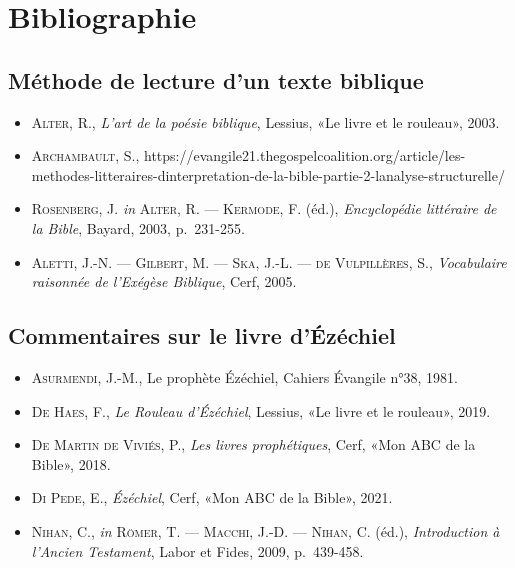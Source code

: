 \section*{Bibliographie}
\subsection*{Méthode de lecture d'un texte biblique}
\begin{itemize}[label=]
    \item \textsc{Alter, R.}, \textit{L'art de la poésie biblique}, Lessius, «Le livre et le rouleau», 2003.
    \item \textsc{Archambault, S.}, https://evangile21.thegospelcoalition.org/article/les-methodes-litteraires-dinterpretation-de-la-bible-partie-2-lanalyse-structurelle/
    \item \textsc{Rosenberg, J.} \textit{in} \textsc{Alter, R. — Kermode, F.} (éd.), \textit{Encyclopédie littéraire de la Bible}, Bayard, 2003, p.~231-255.
    \item \textsc{Aletti, J.-N. — Gilbert, M. — Ska, J.-L. — de Vulpillères, S.}, \textit{Vocabulaire raisonnée de l'Exégèse Biblique}, Cerf, 2005.
\end{itemize}
\subsection*{Commentaires sur le livre d'Ézéchiel}
\begin{itemize}[label=]
    \item \textsc{Asurmendi, J.-M.}, Le prophète Ézéchiel, Cahiers Évangile n°38, 1981.
    \item \textsc{De Haes, F.}, \textit{Le Rouleau d'Ézéchiel}, Lessius, «Le livre et le rouleau», 2019.
    \item \textsc{De Martin de Viviés, P.}, \textit{Les livres prophétiques}, Cerf, «Mon ABC de la Bible», 2018.
    \item \textsc{Di Pede, E.}, \textit{Ézéchiel}, Cerf, «Mon ABC de la Bible», 2021.
    \item \textsc{Nihan, C.}, \textit{in} \textsc{Römer, T. — Macchi, J.-D. — Nihan, C.} (éd.), \textit{Introduction à l'Ancien Testament}, Labor et Fides, 2009, p.~439-458.
\end{itemize}